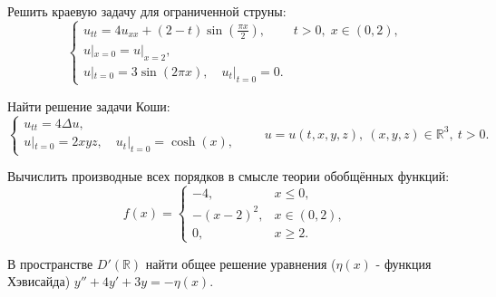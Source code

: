 
\begin{cond}
	Решить краевую задачу для ограниченной струны:
	\[
		\begin{cases}
			u_{tt} = 4u_{xx} + (2 - t)\sin (\frac{\pi x}{2}), & t > 0,\; x \in (0,2), \\
			u|_{x=0} = u|_{x=2},                                                      \\
			u|_{t=0} = 3 \sin (2\pi x),\quad u_t|_{t=0} = 0.
		\end{cases}
	\]
\end{cond}

\begin{sol}

\end{sol}

\begin{out}

\end{out}

\begin{cond}
	Найти решение задачи Коши:
	\[
		\begin{cases}
			u_{tt} = 4\Delta u, \\
			u|_{t=0} = 2xyz,\quad u_t|_{t=0} = \cosh (x),
		\end{cases}
		\qquad
		u = u(t,x,y,z),\ (x,y,z)\in\mathbb{R}^3,\ t>0.
	\]
\end{cond}

\begin{sol}

\end{sol}

\begin{out}

\end{out}

\begin{cond}
	Вычислить производные всех порядков в смысле теории обобщённых функций:
	\[
		f(x) =
		\begin{cases}
			-4,       & x \le 0,     \\
			-(x-2)^2, & x \in (0,2), \\
			0,        & x \ge 2.
		\end{cases}
	\]
\end{cond}

\begin{cond}
	В пространстве $D'(\mathbb{R})$ найти общее решение уравнения ($\eta(x)$ - функция Хэвисайда)
	$y'' + 4y' + 3y = -\eta(x)$.
\end{cond}

\begin{sol}

\end{sol}

\begin{out}

\end{out}